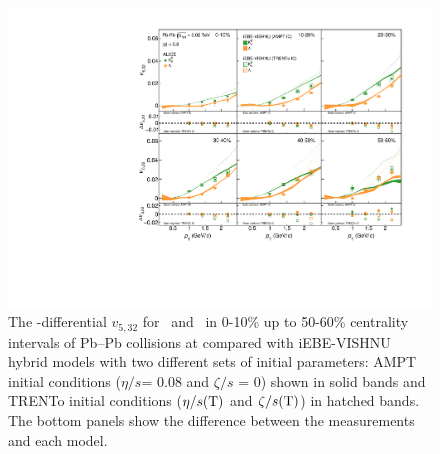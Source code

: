 \documentclass[ALICE,manyauthors]{cernphprep}
\begin{document}
 \begin{figure}[h]
\begin{center}
\includegraphics[scale=0.73]{figures/model/TrentoAndAMPT_v523_gap00_LambdaK0s.pdf}
\end{center}
\caption{The \pT-differential $v_{5,32}$ for \Ks~and \lambdas~in 0-10\% up to 50-60\% centrality intervals of Pb--Pb collisions at \sNN compared with iEBE-VISHNU hybrid models with two different sets of initial parameters: AMPT initial conditions ($\eta/s$= 0.08 and $\zeta/s$ = 0) shown in solid bands and TRENTo initial conditions ($\eta/s({\rm T})$ and $\zeta/s({\rm T})$) in hatched bands. The bottom panels show the difference between the measurements and each model.}
\label{v523_model_KL}
\end{figure}
\end{document}
